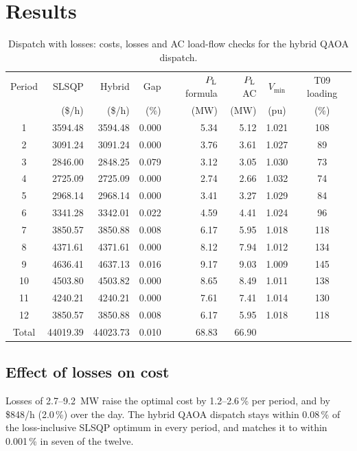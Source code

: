 \section{Results}
\begin{table}[H]
\centering
\caption{Dispatch with losses: costs, losses and AC load-flow checks for the hybrid QAOA dispatch.}
\label{tab:losses}
\small
\begin{tabular}{crrrrrcc}
\toprule
Period & SLSQP & Hybrid & Gap & $P_{\mathrm{L}}$ formula & $P_{\mathrm{L}}$ AC & $V_{\min}$ & T09 loading\\
 & (\$/h) & (\$/h) & (\%) & (MW) & (MW) & (pu) & (\%)\\
\midrule
1 & 3594.48 & 3594.48 & 0.000 & 5.34 & 5.12 & 1.021 & 108\\
2 & 3091.24 & 3091.24 & 0.000 & 3.76 & 3.61 & 1.027 & 89\\
3 & 2846.00 & 2848.25 & 0.079 & 3.12 & 3.05 & 1.030 & 73\\
4 & 2725.09 & 2725.09 & 0.000 & 2.74 & 2.66 & 1.032 & 74\\
5 & 2968.14 & 2968.14 & 0.000 & 3.41 & 3.27 & 1.029 & 84\\
6 & 3341.28 & 3342.01 & 0.022 & 4.59 & 4.41 & 1.024 & 96\\
7 & 3850.57 & 3850.88 & 0.008 & 6.17 & 5.95 & 1.018 & 118\\
8 & 4371.61 & 4371.61 & 0.000 & 8.12 & 7.94 & 1.012 & 134\\
9 & 4636.41 & 4637.13 & 0.016 & 9.17 & 9.03 & 1.009 & 145\\
10 & 4503.80 & 4503.82 & 0.000 & 8.65 & 8.49 & 1.011 & 138\\
11 & 4240.21 & 4240.21 & 0.000 & 7.61 & 7.41 & 1.014 & 130\\
12 & 3850.57 & 3850.88 & 0.008 & 6.17 & 5.95 & 1.018 & 118\\
\midrule
Total & 44019.39 & 44023.73 & 0.010 & 68.83 & 66.90 & & \\
\bottomrule
\end{tabular}
\end{table}

\subsection{Effect of losses on cost}
Losses of 2.7--9.2~MW raise the optimal cost by 1.2--2.6\,\% per period, and by \$848/h (2.0\,\%) over the day. The hybrid QAOA dispatch stays within 0.08\,\% of the loss-inclusive SLSQP optimum in every period, and matches it to within 0.001\,\% in seven of the twelve.

